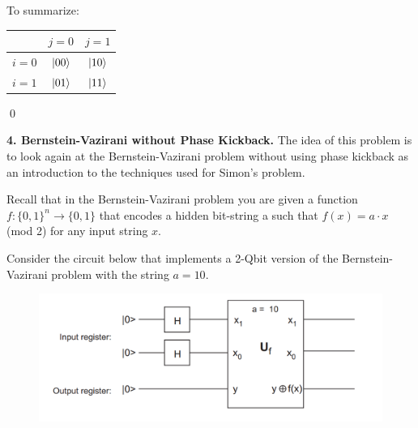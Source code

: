 \documentclass{book}
\theoremstyle{definition}
\begin{document}
\begin{enumerate}[(a)]
	To summarize:
	\begin{center}
	\begin{tabular}{|c|c|c|}
		\hline
			& $j=0$ & $j=1$ \\
		\hline
		$i=0$ & $\ket{00}$ &  $\ket{10}$\\
		\hline
		$i=1$ & $\ket{01}$ & $\ket{11}$ \\
		\hline
	\end{tabular}
	\end{center}
	
\end{enumerate}







\qed



\newpage

\noindent \textbf{4. Bernstein-Vazirani without Phase Kickback.}  The idea of this problem is to look again
at the Bernstein-Vazirani problem without using phase kickback as an introduction to the
techniques used for Simon’s problem. 

Recall that in the Bernstein-Vazirani problem you are given a function $f : \{0, 1\}^n \to \{0, 1\}$ that encodes a hidden bit-string a such that $f(x) = a \cdot x$ (mod 2) for any input string $x$.

Consider the circuit below that implements a 2-Qbit version of the Bernstein-Vazirani problem
with the string $a = 10$.

\begin{figure}[!htb]
	\centering
	\includegraphics[scale=0.25]{phase4}
\end{figure}
\end{document}
